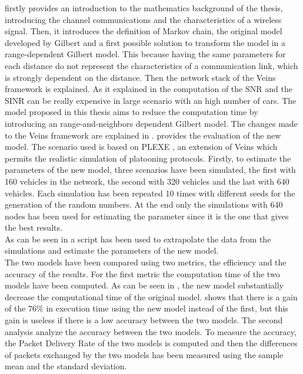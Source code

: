  firstly provides an introduction to the mathematics background of the thesis, introducing the channel communications and the characteristics of a wireless signal. Then, it introduces the definition of Markov chain, the original model developed by Gilbert and a first possible solution to transform the model in a range-dependent Gilbert model. This because having the same parameters for each distance do not represent the characteristics of a communication link, which is strongly dependent on the distance. Then the network stack of the Veins framework is explained. As it explained in  the computation of the SNR and the SINR can be really expensive in large scenario with an high number of cars. The model proposed in this thesis aims to reduce the computation time by introducing an range-and-neighbors dependent Gilbert model. The changes made to the Veins framework are explained in .
 provides the evaluation of the new model. The scenario used is based on PLEXE \cite{segata2014plexe}, an extension of Veins which permits the realistic simulation of platooning protocols. Firstly, to estimate the parameters of the new model, three scenarios have been simulated, the first with 160 vehicles in the network, the second with 320 vehicles and the last with 640 vehicles. Each simulation has been repeated 10 times with different seeds for the generation of the random numbers. At the end only the simulations with 640 nodes has been used for estimating the parameter since it is the one that gives the best results.\\
As can be seen in  a script has been used to extrapolate the data from the simulations and estimate the parameters of the new model.\\
The two models have been compared using two metrics, the efficiency and the accuracy of the results.
For the first metric the computation time of the two models have been computed.
As can be seen in , the new model substantially decrease the computational time of the original model.  shows that there is a gain of the $76\%$ in execution time using the new model instead of the first, but this gain is useless if there is a low accuracy between the two models.
The second analysis analyze the accuracy between the two models. To measure the accuracy, the Packet Delivery Rate of the two models is computed and then the differences of packets exchanged by the two models has been measured using the sample mean and the standard deviation.
